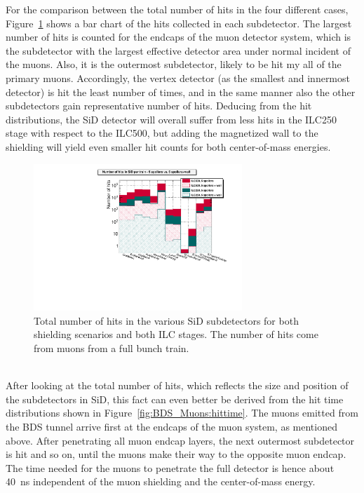 For the comparison between the total number of hits in the four different cases, Figure~\ref{fig:BDS_Muons:hits} shows a bar chart of the hits collected in each subdetector.
The largest number of hits is counted for the endcaps of the muon detector system, which is the subdetector with the largest effective detector area under normal incident of the muons.
Also, it is the outermost subdetector, likely to be hit my all of the primary muons.
Accordingly, the vertex detector (as the smallest and innermost detector) is hit the least number of times, and in the same manner also the other subdetectors gain representative number of hits.
Deducing from the hit distributions, the SiD detector will overall suffer from less hits in the ILC250 stage with respect to the ILC500, but adding the magnetized wall to the shielding will yield even smaller hit counts for both center-of-mass energies.
\begin{figure}[h]
\centering
\includegraphics[width=0.7\textwidth]{Figures/BDS_muons/Hits_in_SiD_subdetectors_MuonSpoilerStudy.pdf}
\caption[Number of muon hits in the SiD subdetectors]{Total number of hits in the various SiD subdetectors for both shielding scenarios and both ILC stages.
The number of hits come from muons from a full bunch train.}
\label{fig:BDS_Muons:hits}
\end{figure}
\\After looking at the total number of hits, which reflects the size and position of the subdetectors in SiD, this fact can even better be derived from the hit time distributions shown in Figure~\ref{fig:BDS_Muons:hittime}.
The muons emitted from the BDS tunnel arrive first at the endcaps of the muon system, as mentioned above.
After penetrating all muon endcap layers, the next outermost subdetector is hit and so on, until the muons make their way to the opposite muon endcap.
The time needed for the muons to penetrate the full detector is hence about \SI{40}{\nano\second} independent of the muon shielding and the center-of-mass energy.
